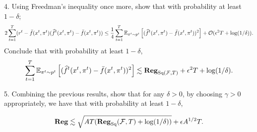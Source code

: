 4. Using Freedman’s inequality once more, show that with probability at least $1-\delta$;
\[ 2\sum_{t=1}^T (r^t-\bar f(x^t,\pi^t)(\wh f^t(x^t,\pi^t)-\bar f(x^t,\pi^t))\leq \frac{1}{4}\sum_{t=1}^T \EEs{(\wh f^t(x^t,\pi^t)-\bar f(x^t,\pi^t))^2}{\pi^t \sim p^t}  + \OO(\epsilon^2 T + \log(1/\delta)).\]
Conclude that with probability at least $1-\delta$,
\[ \sum_{t=1}^T \EEs{(\wh f^t(x^t,\pi^t)- \bar f(x^t,\pi^t))^2}{\pi^t \sim p^t} \lesssim \Reg_{\text{Sq}(\F,T)}+ \epsilon^2T+\log(1/\delta).\]

5. Combining the previous results, show that for any $\delta > 0$,
 by choosing $\gamma > 0$ appropriately, we have that with probability at least $1-\delta$,

 \[ \Reg \lesssim \sqrt{AT(\Reg_{\text{Sq}}(\F,T)+\log(1/\delta))} +\epsilon A^{1/2}T.  \]


